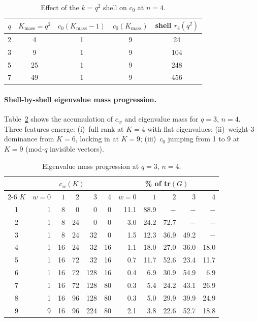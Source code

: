\documentclass[twocolumn,prx,aps,superscriptaddress,longbibliography]{revtex4-2}
\begin{document}
\begin{table}[ht!]
\caption{Effect of the $k = q^2$ shell on $c_0$ at $n = 4$.}
\label{tab:shell}
\begin{ruledtabular}
\begin{tabular}{ccccc}
$q$ & $K_{\mathrm{mass}} = q^2$ & $c_0(K_{\mathrm{mass}}{-}1)$ & $c_0(K_{\mathrm{mass}})$ &
shell $r_4(q^2)$ \\
\hline
2 & 4  & 1 & 9   & 24  \\
3 & 9  & 1 & 9   & 104 \\
5 & 25 & 1 & 9   & 248 \\
7 & 49 & 1 & 9   & 456 \\
\end{tabular}
\end{ruledtabular}
\end{table}

\paragraph{Shell-by-shell eigenvalue mass progression.}

Table~\ref{tab:progression} shows the accumulation of $c_w$ and
eigenvalue mass for $q = 3$, $n = 4$.  Three features emerge:
(i)~full rank at $K = 4$ with flat eigenvalues;
(ii)~weight-3 dominance from $K = 6$, locking in at $K = 9$;
(iii)~$c_0$ jumping from 1 to 9 at $K = 9$ (mod-$q$ invisible
vectors).

\begin{table}[ht!]
\caption{Eigenvalue mass progression at $q = 3$, $n = 4$.}
\label{tab:progression}
\begin{ruledtabular}
\begin{tabular}{crrrrrrrrrr}
 & \multicolumn{5}{c}{$c_w(K)$}
 & \multicolumn{5}{c}{\% of tr$(G)$} \\
\cline{2-6}\cline{7-11}
$K$ & $w{=}0$ & $1$ & $2$ & $3$ & $4$
    & $w{=}0$ & $1$ & $2$ & $3$ & $4$ \\
\hline
1 & 1 &  8 &   0 &   0 &  0
  & 11.1 & 88.9 & $-$ & $-$ & $-$ \\
2 & 1 &  8 &  24 &   0 &  0
  & 3.0 & 24.2 & 72.7 & $-$ & $-$ \\
3 & 1 &  8 &  24 &  32 &  0
  & 1.5 & 12.3 & 36.9 & 49.2 & $-$ \\
4 & 1 & 16 &  24 &  32 & 16
  &  1.1 & 18.0 & 27.0 & 36.0 & 18.0 \\
5 & 1 & 16 &  72 &  32 & 16
  &  0.7 & 11.7 & 52.6 & 23.4 & 11.7 \\
6 & 1 & 16 &  72 & 128 & 16
  &  0.4 & 6.9 & 30.9 & 54.9 & 6.9 \\
7 & 1 & 16 &  72 & 128 & 80
  &  0.3 & 5.4 & 24.2 & 43.1 & 26.9 \\
8 & 1 & 16 &  96 & 128 & 80
  &  0.3 & 5.0 & 29.9 & 39.9 & 24.9 \\
9 & 9 & 16 &  96 & 224 & 80
  &  2.1 & 3.8 & 22.6 & 52.7 & 18.8 \\
\end{tabular}
\end{ruledtabular}
\end{table}
\end{document}
